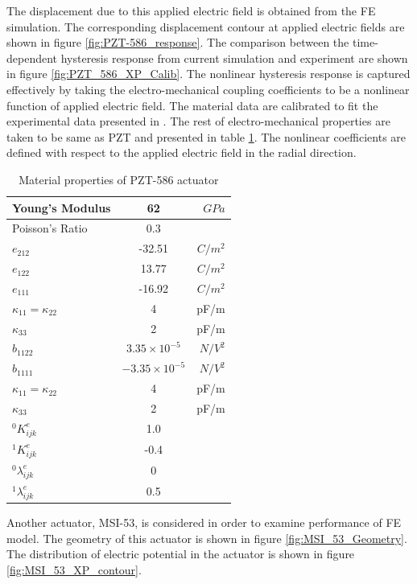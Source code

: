 The displacement due to this applied electric field is obtained from the FE simulation. 
The corresponding displacement contour at applied electric fields are shown in figure \ref{fig:PZT-586_response}. 
The comparison between the time-dependent hysteresis response from current simulation and experiment are shown in figure \ref{fig:PZT_586_XP_Calib}. 
The nonlinear hysteresis response is captured effectively by taking the electro-mechanical coupling coefficients to be a nonlinear function of applied electric field. 
The material data are calibrated to fit the experimental data presented in \cite{Alexander,Alexander2003}. 
The rest of electro-mechanical properties are taken to be same as PZT and presented in table \ref{table:MatPZT_PZT_586}. 
The nonlinear coefficients are defined with respect to the applied electric field in the radial direction.
\begin{table}
\caption{Material properties of PZT-586 actuator \cite{Alexander}}
\centering
\begin{tabular}{|l|c|r|}
\hline 
Young's Modulus&62& $GPa$\\ \hline
Poisson's Ratio&0.3& \\ \hline 
$e_{212}$ &-32.51&$C/m^2$\\ \hline
$e_{122}$ &13.77&$C/m^2$\\ \hline
$e_{111}$ & -16.92&$C/m^2$\\ \hline
$\kappa_{11}=\kappa_{22}$ & 4 &pF/m\\ \hline
$\kappa_{33}$ & 2 &pF/m\\ \hline
$\widehat{b}_{1122}$ & $3.35 \times 10^{-5}$ &  $ N/V^2 $\\ \hline
$\widehat{b}_{1111} $ & $-3.35 \times 10^{-5}$ &$ N/V^2 $\\ \hline
$\kappa_{11}=\kappa_{22}$ & 4 &pF/m\\ \hline
$\kappa_{33}$ & 2 &pF/m\\ \hline
${}^{0}K_{ijk}^{e}$&1.0&\\ \hline
${}^{1}K_{ijk}^{e}$&-0.4&\\ \hline
${}^{0}\lambda_{ijk}^{e}$&0&\\ \hline
${}^{1}\lambda_{ijk}^{e}$&0.5&\\ \hline 
\end{tabular}
\label{table:MatPZT_PZT_586}
\end{table}
Another actuator, MSI-53, is considered in order to examine performance of FE model. 
The geometry of this actuator is shown in figure \ref{fig:MSI_53_Geometry}. 
The distribution of electric potential in the actuator is shown in figure \ref{fig:MSI_53_XP_contour}. 
